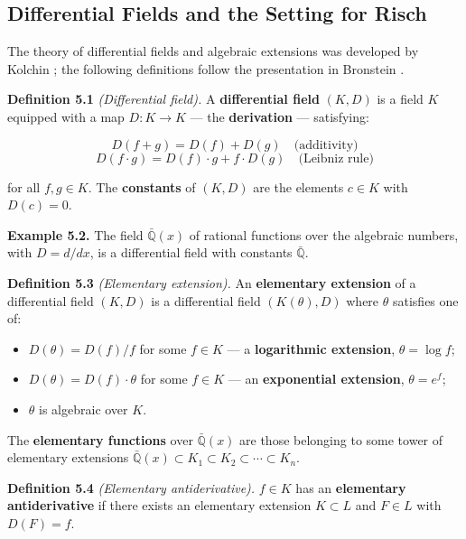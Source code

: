 \documentclass[12pt]{article}
\providecommand{\tightlist}{\setlength{\itemsep}{0pt}\setlength{\parskip}{0pt}}
\begin{document}
\subsection{Differential Fields and the Setting for
Risch}\label{differential-fields-and-the-setting-for-risch}

The theory of differential fields and algebraic extensions was developed
by Kolchin \cite{kolchin1973}; the following definitions follow the
presentation in Bronstein \cite{bronstein2005}.

\textbf{Definition 5.1} \emph{(Differential field).} A
\textbf{differential field} \((K, D)\) is a field \(K\) equipped with a
map \(D : K \to K\) --- the \textbf{derivation} --- satisfying:

\[D(f + g) = D(f) + D(g) \quad \text{(additivity)}\]
\[D(f \cdot g) = D(f) \cdot g + f \cdot D(g) \quad \text{(Leibniz rule)}\]

for all \(f, g \in K\). The \textbf{constants} of \((K, D)\) are the
elements \(c \in K\) with \(D(c) = 0\).

\textbf{Example 5.2.} The field \(\bar{\mathbb{Q}}(x)\) of rational
functions over the algebraic numbers, with \(D = d/dx\), is a
differential field with constants \(\bar{\mathbb{Q}}\).

\textbf{Definition 5.3} \emph{(Elementary extension).} An
\textbf{elementary extension} of a differential field \((K, D)\) is a
differential field \((K(\theta), D)\) where \(\theta\) satisfies one of:

\begin{itemize}
\tightlist
\item
  \(D(\theta) = D(f)/f\) for some \(f \in K\) --- a \textbf{logarithmic
  extension}, \(\theta = \log f\);
\item
  \(D(\theta) = D(f) \cdot \theta\) for some \(f \in K\) --- an
  \textbf{exponential extension}, \(\theta = e^f\);
\item
  \(\theta\) is algebraic over \(K\).
\end{itemize}

The \textbf{elementary functions} over \(\bar{\mathbb{Q}}(x)\) are those
belonging to some tower of elementary extensions
\(\bar{\mathbb{Q}}(x) \subset K_1 \subset K_2 \subset \cdots \subset K_n\).

\textbf{Definition 5.4} \emph{(Elementary antiderivative).} \(f \in K\)
has an \textbf{elementary antiderivative} if there exists an elementary
extension \(K \subset L\) and \(F \in L\) with \(D(F) = f\).
\end{document}
